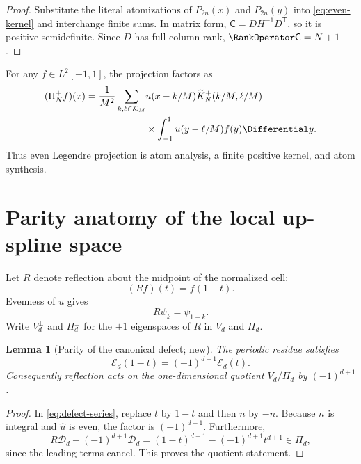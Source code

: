 \documentclass[11pt,oneside]{article}
\numberwithin{equation}{section}
\newtheorem{lemma}[theorem]{Lemma}
\theoremstyle{definition}
\theoremstyle{remark}
\begin{document}
\begin{proof}
Substitute the literal atomizations of $P_{2n}(x)$ and $P_{2n}(y)$ into
\eqref{eq:even-kernel} and interchange finite sums.  In matrix form,
$\mathsf C=DH^{-1}D^{\mathsf T}$, so it is positive semidefinite.  Since $D$
has full column rank, $\RankOperator\mathsf C=N+1$.
\end{proof}

For any $f\in L^2[-1,1]$, the projection factors as
\begin{align}
 (\Pi_N^+f)(x)=\frac1{M^2}\sum_{k,\ell\in\mathcal K_M}
 &u(x-k/M)\widetilde K_N^+(k/M,\ell/M)\notag\\
 &\times\int_{-1}^{1}u(y-\ell/M)f(y)\Differential y.
 \label{eq:two-sided-projection}
\end{align}
Thus even Legendre projection is atom analysis, a finite positive kernel, and
atom synthesis.

\section{Parity anatomy of the local up-spline space}
\label{sec:parity}

Let $R$ denote reflection about the midpoint of the normalized cell:
\begin{equation}
 (Rf)(t)=f(1-t).
 \label{eq:reflection}
\end{equation}
Evenness of $u$ gives
\begin{equation}
 R\psi_k=\psi_{1-k}.
 \label{eq:reflection-atoms}
\end{equation}
Write $V_d^\pm$ and $\Pi_d^\pm$ for the $\pm1$ eigenspaces of $R$ in $V_d$
and $\Pi_d$.

\begin{lemma}[Parity of the canonical defect; new]
\label{lem:defect-parity}
The periodic residue satisfies
\begin{equation}
 \mathcal E_d(1-t)=(-1)^{d+1}\mathcal E_d(t).
 \label{eq:E-reflection}
\end{equation}
Consequently reflection acts on the one-dimensional quotient $V_d/\Pi_d$ by
$(-1)^{d+1}$.
\end{lemma}

\begin{proof}
In \eqref{eq:defect-series}, replace $t$ by $1-t$ and then $n$ by $-n$.
Because $n$ is integral and $\widehat u$ is even, the factor is
$(-1)^{d+1}$.  Furthermore,
\[
 R\mathcal D_d-(-1)^{d+1}\mathcal D_d
 =(1-t)^{d+1}-(-1)^{d+1}t^{d+1}\in\Pi_d,
\]
since the leading terms cancel.  This proves the quotient statement.
\end{proof}
\end{document}
